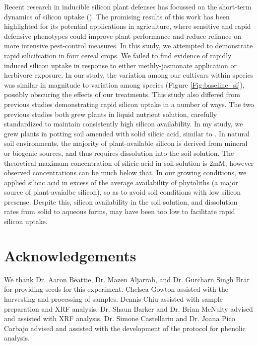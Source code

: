 \documentclass[12pt, letterpaper, ]{report}
\begin{document}
Recent research in inducible silicon plant defenses has focussed on the short-term dynamics of silicon uptake (\cite{waterman_short-term_2021,waterman_short-term_2021-1}). The promising results of this work has been highlighted for its potential applications in agriculture, where sensitive and rapid defensive phenotypes could improve plant performance and reduce reliance on more intensive pest-control measures. In this study, we attempted to demonstrate rapid silicifcation in four cereal crops. We failed to find evidence of rapidly induced silicon uptake in response to either methly-jasmonate application or herbivore exposure. In our study, the variation among our cultivars within species was similar in magnitude to variation among species (Figure \ref{Fig:baseline_si}), possibly obscuring the effects of our treatments. This study also differed from previous studies demonstrating rapid silicon uptake in a number of ways. The two previous studies both grew plants in liquid nutrient solution, carefully standardized to maintain consistently high silicon availability. In my study, we grew plants in potting soil amended with solid silicic acid, similar to \textcite{nascimento_silicon_2019}. In natural soil environments, the majority of plant-available silicon is derived from mineral or biogenic sources, and thus requires dissolution into the soil solution. The theoretical maximum concentration of silicic acid in soil solution is 2mM, however observed concentrations can be much below that. In our growing conditions, we applied silicic acid in excess of the average availability of phytoliths (a major source of plant-avaialbe silicon), so as to avoid soil conditions with low silicon presense. Despite this, silicon availability in the soil solution, and dissolution rates from solid to aqueous forms, may have been too low to facilitate rapid silicon uptake. 

\section{Acknowledgements}

We thank Dr. Aaron Beattie, Dr. Mazen Aljarrah, and Dr. Gurcharn Singh Brar for providing seeds for this experiment. Chelsea Gowton assisted with the harvesting and processing of samples. Dennis Chiu assisted with sample preparation and XRF analysis. Dr. Shaun Barker and Dr. Brian McNulty advised and assisted with XRF analysis. Dr. Simone Castellarin and Dr. Joana Pico Carbajo advised and assisted with the development of the protocol for phenolic analysis. 
\end{document}

